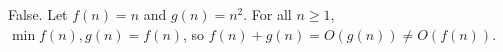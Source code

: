 False.
Let $f(n)=n$ and $g(n)=n^2$.
For all $n\ge1$, $\min{f(n),g(n)}=f(n)$, so $f(n)+g(n)=O(g(n))\ne O(f(n))$.
